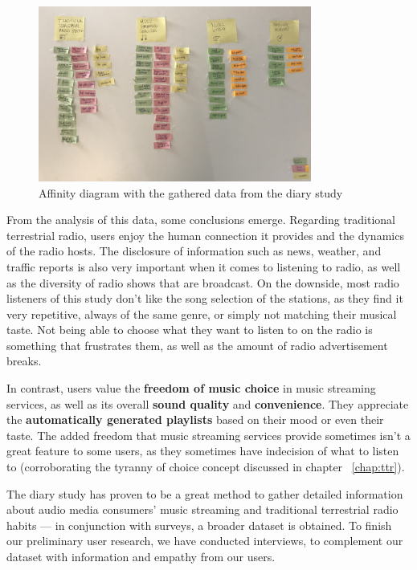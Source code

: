 \begin{figure}[h]
\centering
\includegraphics[width=0.8\textwidth]{./Images/affinitydiagram.jpg}
\caption{Affinity diagram with the gathered data from the diary study}
\label{fig:diagram1}
\end{figure}


From the analysis of this data, some conclusions emerge. Regarding traditional terrestrial radio, users enjoy the human connection it provides and the dynamics of the radio hosts. The disclosure of information such as news, weather, and traffic reports is also very important when it comes to listening to radio, as well as the diversity of radio shows that are broadcast. On the downside, most radio listeners of this study don't like the song selection of the stations, as they find it very repetitive, always of the same genre, or simply not matching their musical taste. Not being able to choose what they want to listen to on the radio is something that frustrates them, as well as the amount of radio advertisement breaks.

In contrast, users value the \textbf{freedom of music choice} in music streaming services, as well as its overall \textbf{sound quality} and \textbf{convenience}. They appreciate the \textbf{automatically generated playlists} based on their mood or even their taste. The added freedom that music streaming services provide sometimes isn't a great feature to some users, as they sometimes have indecision of what to listen to (corroborating the tyranny of choice concept discussed in chapter ~\ref{chap:ttr}). 

The diary study has proven to be a great method to gather detailed information about audio media consumers' music streaming and traditional terrestrial radio habits — in conjunction with surveys, a broader dataset is obtained. To finish our preliminary user research, we have conducted interviews, to complement our dataset with information and empathy from our users.

